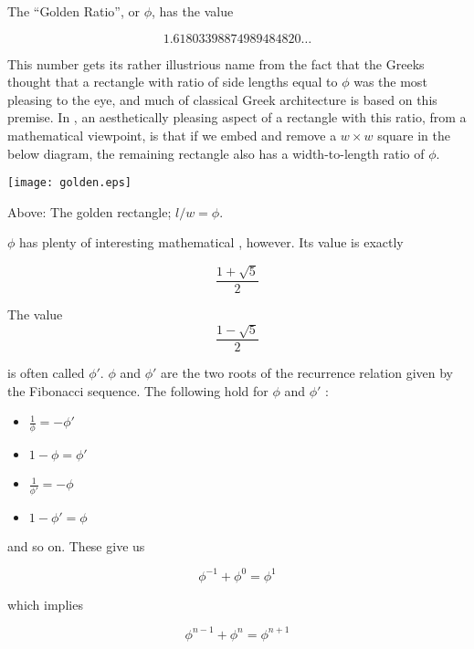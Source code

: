 \documentclass[12pt]{article}
\begin{document}
The ``Golden Ratio'', or $\phi$, has the value 

$$ 1.61803398874989484820\ldots $$

This number gets its rather illustrious name from the fact that the Greeks thought that a rectangle with ratio of side lengths equal to $\phi$ was the most pleasing to the eye, and much of classical Greek architecture is based on this premise.  In , an aesthetically pleasing aspect of a rectangle with this ratio, from a mathematical viewpoint, is that if we embed and remove a $w\times w$ square in the below diagram, the remaining rectangle also has a width-to-length ratio of $\phi$.

\begin{center}

\texttt{[image: golden.eps]}

{\tiny Above: The golden rectangle; $l/w = \phi$. }
\end{center}

$\phi$ has plenty of interesting mathematical , however.  Its value is exactly

$$ \frac{1+\sqrt{5}}{2} $$

The value 
$$ \frac{1-\sqrt{5}}{2} $$

is often called $\phi'$.  $\phi$ and $\phi'$ are the two roots of the recurrence relation given by the Fibonacci sequence.  The following  hold for $\phi$ and $\phi'$ :

\begin{itemize}
\item $\frac{1}{\phi} = - \phi' $
\item $1-\phi = \phi'$
\item $\frac{1}{\phi'} = - \phi $
\item $1-\phi' = \phi $
\end{itemize}

and so on.  These give us

$$ \phi^{-1} + \phi^0 = \phi^{1} $$

which implies 

$$ \phi^{n-1} + \phi^n = \phi^{n+1} $$
\end{document}
